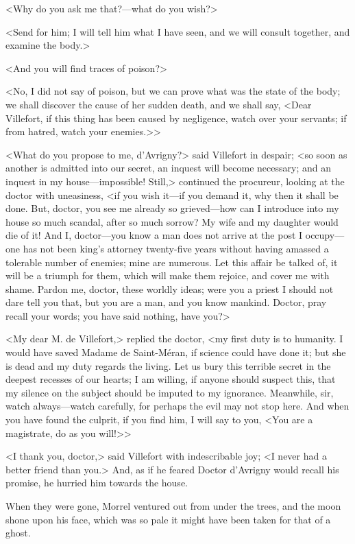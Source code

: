 <Why do you ask me that?—what do you wish?> 

 <Send for him; I will tell him what I have seen, and we will consult together, and examine the body.> 

 <And you will find traces of poison?> 

 <No, I did not say of poison, but we can prove what was the state of the body; we shall discover the cause of her sudden death, and we shall say, <Dear Villefort, if this thing has been caused by negligence, watch over your servants; if from hatred, watch your enemies.>> 

 <What do you propose to me, d'Avrigny?> said Villefort in despair; <so soon as another is admitted into our secret, an inquest will become necessary; and an inquest in my house—impossible! Still,> continued the procureur, looking at the doctor with uneasiness, <if you wish it—if you demand it, why then it shall be done. But, doctor, you see me already so grieved—how can I introduce into my house so much scandal, after so much sorrow? My wife and my daughter would die of it! And I, doctor—you know a man does not arrive at the post I occupy—one has not been king's attorney twenty-five years without having amassed a tolerable number of enemies; mine are numerous. Let this affair be talked of, it will be a triumph for them, which will make them rejoice, and cover me with shame. Pardon me, doctor, these worldly ideas; were you a priest I should not dare tell you that, but you are a man, and you know mankind. Doctor, pray recall your words; you have said nothing, have you?> 

 <My dear M. de Villefort,> replied the doctor, <my first duty is to humanity. I would have saved Madame de Saint-Méran, if science could have done it; but she is dead and my duty regards the living. Let us bury this terrible secret in the deepest recesses of our hearts; I am willing, if anyone should suspect this, that my silence on the subject should be imputed to my ignorance. Meanwhile, sir, watch always—watch carefully, for perhaps the evil may not stop here. And when you have found the culprit, if you find him, I will say to you, <You are a magistrate, do as you will!>> 

 <I thank you, doctor,> said Villefort with indescribable joy; <I never had a better friend than you.> And, as if he feared Doctor d'Avrigny would recall his promise, he hurried him towards the house. 

 When they were gone, Morrel ventured out from under the trees, and the moon shone upon his face, which was so pale it might have been taken for that of a ghost. 

